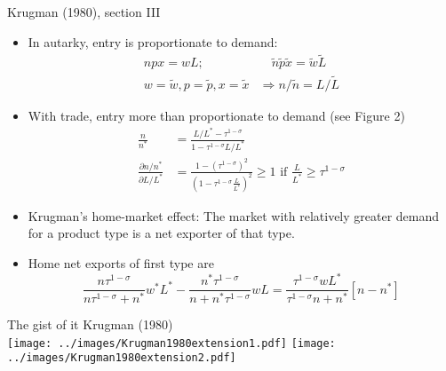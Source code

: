 \documentclass[11pt,notes=hide,aspectratio=169]{beamer}
\begin{document}
\begin{frame}{Krugman (1980), section III}
\linespread{1.0}
\begin{itemize}
	\item In autarky, entry is proportionate to demand:
	\begin{align*}
	npx = wL; & \quad \tilde{n}\tilde{p}\tilde{x} = \tilde{w}\tilde{L} \\
	w=\tilde{w}, p=\tilde{p}, x=\tilde{x} & \Rightarrow n/\tilde{n} = L / \tilde{L}
	\end{align*}
	\item With trade, entry more than proportionate to demand (see Figure 2)
	\begin{align*}
	\frac{n}{n^*} &= \frac{L/L^* - \tau^{1-\sigma}}{1 - \tau^{1-\sigma}L/L^*} \\
	\frac{\partial n/n^*}{\partial L/L^*} &= \frac{1 - \left(\tau^{1-\sigma} \right)^2}{\left(1 - \tau^{1-\sigma}\frac{L}{L^*}\right)^2} \geq 1 \text{ if } \frac{L}{L^*}\geq \tau^{1-\sigma}
	\end{align*}
	\item Krugman's home-market effect: The market with relatively greater demand for a product type is a net exporter of that type.
	\item Home net exports of first type are
$$
\frac{n\tau^{1-\sigma}}{n\tau^{1-\sigma} + n^*} w^* L^*  - \frac{n^*\tau^{1-\sigma}}{n + n^*\tau^{1-\sigma}} w L  = \frac{\tau^{1-\sigma}wL^*}{\tau^{1-\sigma}n+n^*} \left[n - n^*\right]
$$
\end{itemize}
\end{frame}
\begin{frame}{The gist of it}
Krugman (1980)\\
\hfill
\texttt{[image: ../images/Krugman1980extension1.pdf]} \hfill
\texttt{[image: ../images/Krugman1980extension2.pdf]}
\end{frame}
\end{document}
